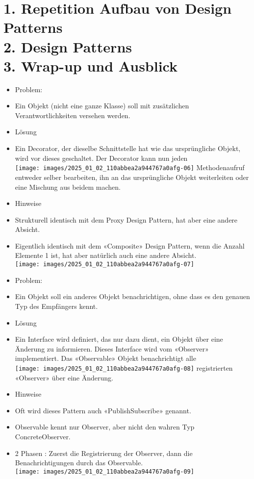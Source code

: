 \documentclass[10pt]{article}
\begin{document}
\section*{1. Repetition Aufbau von Design Patterns \\
 2. Design Patterns \\
 3. Wrap-up und Ausblick }
\begin{itemize}
  \item Problem:
  \item Ein Objekt (nicht eine ganze Klasse) soll mit zusätzlichen Verantwortlichkeiten versehen werden.
  \item Lösung
  \item Ein Decorator, der dieselbe Schnittstelle hat wie das ursprüngliche Objekt, wird vor dieses geschaltet. Der Decorator kann nun jeden\\
\texttt{[image: images/2025\_01\_02\_110abbea2a944767a0afg-06]} Methodenaufruf entweder selber bearbeiten, ihn an das ursprüngliche Objekt weiterleiten oder eine Mischung aus beidem machen.
  \item Hinweise
  \item Strukturell identisch mit dem Proxy Design Pattern, hat aber eine andere Absicht.
  \item Eigentlich identisch mit dem «Composite» Design Pattern, wenn die Anzahl Elemente 1 ist, hat aber natürlich auch eine andere Absicht.\\
\texttt{[image: images/2025\_01\_02\_110abbea2a944767a0afg-07]}
  \item Problem:
  \item Ein Objekt soll ein anderes Objekt benachrichtigen, ohne dass es den genauen Typ des Empfängers kennt.
  \item Lösung
  \item Ein Interface wird definiert, das nur dazu dient, ein Objekt über eine Änderung zu informieren. Dieses Interface wird vom «Observer» implementiert. Das «Observable» Objekt benachrichtigt alle\\
\texttt{[image: images/2025\_01\_02\_110abbea2a944767a0afg-08]} registrierten «Observer» über eine Änderung.
  \item Hinweise
  \item Oft wird dieses Pattern auch «PublishSubscribe» genannt.
  \item Observable kennt nur Observer, aber nicht den wahren Typ ConcreteObserver.
  \item 2 Phasen : Zuerst die Registrierung der Observer, dann die Benachrichtigungen durch das Observable.\\
\texttt{[image: images/2025\_01\_02\_110abbea2a944767a0afg-09]}
\end{itemize}
\end{document}
